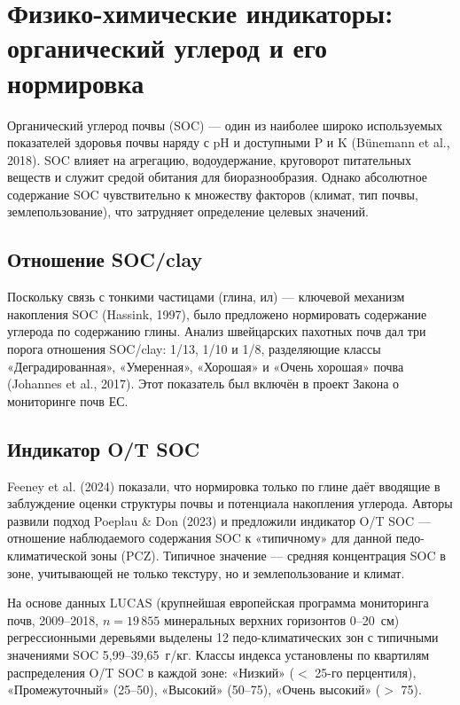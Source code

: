\documentclass[11pt,a4paper]{article}
\begin{document}
\section{Физико-химические индикаторы: органический углерод и его нормировка}
\label{sec:physchem}

Органический углерод почвы (SOC) --- один из наиболее широко используемых
показателей здоровья почвы наряду с pH и доступными P и K (Bünemann et al.,
2018). SOC влияет на агрегацию, водоудержание, круговорот питательных веществ
и служит средой обитания для биоразнообразия. Однако абсолютное содержание
SOC чувствительно к множеству факторов (климат, тип почвы, землепользование),
что затрудняет определение целевых значений.

\subsection{Отношение SOC/clay}

Поскольку связь с тонкими частицами (глина, ил) --- ключевой механизм
накопления SOC (Hassink, 1997), было предложено нормировать содержание
углерода по содержанию глины. Анализ швейцарских пахотных почв дал три порога
отношения SOC/clay: 1/13, 1/10 и 1/8, разделяющие классы «Деградированная»,
«Умеренная», «Хорошая» и «Очень хорошая» почва (Johannes et al., 2017).
Этот показатель был включён в проект Закона о мониторинге почв ЕС.

\subsection{Индикатор O/T SOC}

Feeney et al. (2024) показали, что нормировка только по глине даёт
вводящие в заблуждение оценки структуры почвы и потенциала накопления
углерода. Авторы развили подход Poeplau \& Don (2023) и предложили индикатор
O/T SOC --- отношение наблюдаемого содержания SOC к «типичному» для данной
педо-климатической зоны (PCZ). Типичное значение --- средняя концентрация SOC
в зоне, учитывающей не только текстуру, но и землепользование и климат.

На основе данных LUCAS (крупнейшая европейская программа мониторинга почв,
2009--2018, $n = 19\,855$ минеральных верхних горизонтов 0--20~см)
регрессионными деревьями выделены 12 педо-климатических зон с типичными
значениями SOC 5,99--39,65~г/кг. Классы индекса установлены по квартилям
распределения O/T SOC в каждой зоне: «Низкий» ($<$ 25-го перцентиля),
«Промежуточный» (25--50), «Высокий» (50--75), «Очень высокий» ($>$ 75).
\end{document}
